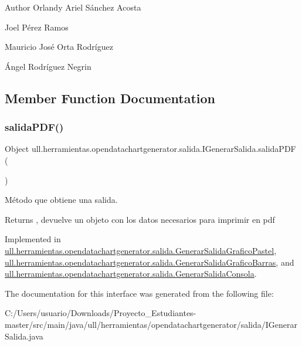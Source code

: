 \begin{DoxyAuthor}{Author}
Orlandy Ariel Sánchez Acosta 

Joel Pérez Ramos 

Mauricio José Orta Rodríguez 

Ángel Rodríguez Negrin 
\end{DoxyAuthor}


\subsection{Member Function Documentation}
\mbox{\label{interfaceull_1_1herramientas_1_1opendatachartgenerator_1_1salida_1_1_i_generar_salida_ac79d306ba661c9ee5375874289a3aa26}} 
\subsubsection{\texorpdfstring{salida\+P\+D\+F()}{salidaPDF()}}
{\footnotesize\ttfamily Object ull.\+herramientas.\+opendatachartgenerator.\+salida.\+I\+Generar\+Salida.\+salida\+P\+DF (\begin{DoxyParamCaption}{ }\end{DoxyParamCaption})}



Método que obtiene una salida. 

\begin{DoxyReturn}{Returns}
, devuelve un objeto con los datos necesarios para imprimir en pdf 
\end{DoxyReturn}


Implemented in \mbox{\hyperlink{classull_1_1herramientas_1_1opendatachartgenerator_1_1salida_1_1_generar_salida_grafico_pastel_ad751df6b5bfef8e06f6b3601faad2440}{ull.\+herramientas.\+opendatachartgenerator.\+salida.\+Generar\+Salida\+Grafico\+Pastel}}, \mbox{\hyperlink{classull_1_1herramientas_1_1opendatachartgenerator_1_1salida_1_1_generar_salida_grafico_barras_a1b5419dd7233660c7487f6b4f218854c}{ull.\+herramientas.\+opendatachartgenerator.\+salida.\+Generar\+Salida\+Grafico\+Barras}}, and \mbox{\hyperlink{classull_1_1herramientas_1_1opendatachartgenerator_1_1salida_1_1_generar_salida_consola_a77ed2e5c73405f6fc732597ff06e421c}{ull.\+herramientas.\+opendatachartgenerator.\+salida.\+Generar\+Salida\+Consola}}.



The documentation for this interface was generated from the following file\+:\begin{DoxyCompactItemize}
\item 
C\+:/\+Users/usuario/\+Downloads/\+Proyecto\+\_\+\+Estudiantes-\/master/src/main/java/ull/herramientas/opendatachartgenerator/salida/I\+Generar\+Salida.\+java\end{DoxyCompactItemize}
